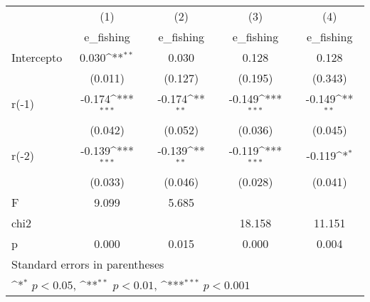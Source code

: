 {
\def\sym#1{\ifmmode^{#1}\else\(^{#1}\)\fi}
\begin{longtable}{l*{4}{c}}
\hline\hline\endfirsthead\hline\endhead\hline\endfoot\endlastfoot
            &\multicolumn{1}{c}{(1)}&\multicolumn{1}{c}{(2)}&\multicolumn{1}{c}{(3)}&\multicolumn{1}{c}{(4)}\\
            &\multicolumn{1}{c}{e\_fishing}&\multicolumn{1}{c}{e\_fishing}&\multicolumn{1}{c}{e\_fishing}&\multicolumn{1}{c}{e\_fishing}\\
\hline
Intercepto  &       0.030\sym{**} &       0.030         &       0.128         &       0.128         \\
            &     (0.011)         &     (0.127)         &     (0.195)         &     (0.343)         \\
r(-1)       &      -0.174\sym{***}&      -0.174\sym{**} &      -0.149\sym{***}&      -0.149\sym{**} \\
            &     (0.042)         &     (0.052)         &     (0.036)         &     (0.045)         \\
r(-2)       &      -0.139\sym{***}&      -0.139\sym{**} &      -0.119\sym{***}&      -0.119\sym{*}  \\
            &     (0.033)         &     (0.046)         &     (0.028)         &     (0.041)         \\
\hline
F           &       9.099         &       5.685         &                     &                     \\
chi2        &                     &                     &      18.158         &      11.151         \\
p           &       0.000         &       0.015         &       0.000         &       0.004         \\
\hline\hline
\multicolumn{5}{l}{\footnotesize Standard errors in parentheses}\\
\multicolumn{5}{l}{\footnotesize \sym{*} \(p<0.05\), \sym{**} \(p<0.01\), \sym{***} \(p<0.001\)}\\
\end{longtable}
}
